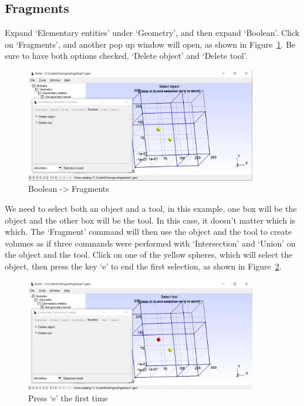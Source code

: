 \subsection{Fragments}

Expand `Elementary entities' under `Geometry', and then expand `Boolean'.  Click on `Fragments', and another pop up window will open, as shown in Figure~\ref{fg:gmsh-19}.  Be sure to have both options checked, `Delete object' and `Delete tool'.

\begin{figure}[H]
\centering
\includegraphics[width=0.9\textwidth]{gmsh-19}
\caption{Boolean -> Fragments}\label{fg:gmsh-19}
\end{figure}

We need to select both an object and a tool, in this example, one box will be the object and the other box will be the tool.  In this case, it doesn't matter which is which.  The `Fragment' command will then use the object and the tool to create volumes as if three commands were performed with `Intersection' and `Union' on the object and the tool.  Click on one of the yellow spheres, which will select the object, then press the key `e' to end the first selection, as shown in Figure~\ref{fg:gmsh-20}.

\begin{figure}[H]
\centering
\includegraphics[width=0.9\textwidth]{gmsh-20}
\caption{Press `e' the first time}\label{fg:gmsh-20}
\end{figure}

